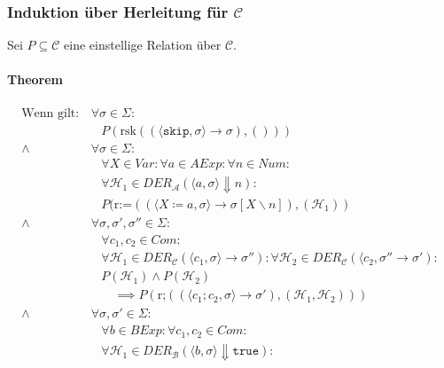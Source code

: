\documentclass[a4paper, 11pt, accentcolor = tud3b]{tudreport}
\begin{document}
			    
			    \subsubsection{Induktion über Herleitung für $ \mathcal{C} $}
				    Sei $ P \subseteq \mathcal{C} $ eine einstellige Relation über $ \mathcal{C} $.
				    
				    \paragraph{Theorem}
					    \begin{align*}
						    \text{Wenn gilt:} & \,\forall \sigma \in \Sigma : \\
							    &\quad P(\text{rsk}((\langle \texttt{skip}, \sigma \rangle \rightarrow \sigma), ())) \\
						    \land & \,\forall \sigma \in \Sigma : \\
							    &\quad \forall X \in \textit{Var} : \forall a \in \textit{AExp} : \forall n \in \textit{Num} : \\
							    &\quad \forall \mathcal{H} _ 1 \in \textit{DER} _ \mathcal{A} (\langle a, \sigma \rangle \Downarrow n) : \\
							    &\quad P(\text{r:=}((\langle X \coloneqq a, \sigma \rangle \rightarrow \sigma[X \backslash n]), (\mathcal{H} _ 1)) \\
						    \land & \,\forall \sigma, \sigma', \sigma'' \in \Sigma : \\
							    &\quad \forall c _ 1, c _ 2 \in \textit{Com} : \\
							    &\quad \forall \mathcal{H} _ 1 \in \textit{DER} _ \mathcal{C} (\langle c _ 1, \sigma \rangle \rightarrow \sigma'') : \forall \mathcal{H} _ 2 \in \textit{DER} _ \mathcal{C} (\langle c _ 2, \sigma'' \rightarrow \sigma') : \\
							    &\quad P(\mathcal{H} _ 1) \land P(\mathcal{H} _ 2) \\
							    &\quad\quad \implies P(\text{r;}((\langle c _ 1 ; c _ 2, \sigma \rangle \rightarrow \sigma'), (\mathcal{H} _ 1, \mathcal{H} _ 2))) \\
						    \land & \,\forall \sigma, \sigma' \in \Sigma : \\
							    &\quad \forall b \in \textit{BExp} : \forall c _ 1, c _ 2 \in \textit{Com} : \\
							    &\quad \forall \mathcal{H} _ 1 \in \textit{DER} _ \mathcal{B} (\langle b, \sigma \rangle \Downarrow \texttt{true}) : \\

\end{align*}
\end{document}

